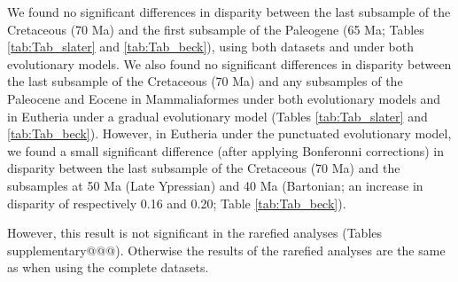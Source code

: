\documentclass[12pt,letterpaper]{article}
\begin{document}
We found no significant differences in disparity between the last subsample of the Cretaceous (70 Ma) and the first subsample of the Paleogene (65 Ma; Tables \ref{tab:Tab_slater} and \ref{tab:Tab_beck}), using both datasets and under both evolutionary models. 
We also found no significant differences in disparity between the last subsample of the Cretaceous (70 Ma) and any subsamples of the Paleocene and Eocene in Mammaliaformes under both evolutionary models and in Eutheria under a gradual evolutionary model (Tables \ref{tab:Tab_slater} and \ref{tab:Tab_beck}).
However, in Eutheria under the punctuated evolutionary model, we found a small significant difference (after applying Bonferonni corrections) in disparity between the last subsample of the Cretaceous (70 Ma) and the subsamples at 50 Ma (Late Ypressian) and 40 Ma (Bartonian; an increase in disparity of respectively 0.16 and 0.20; Table \ref{tab:Tab_beck}). %


However, this result is not significant in the rarefied analyses (Tables supplementary@@@). 
Otherwise the results of the rarefied analyses are the same as when using the complete datasets. 
\end{document}
